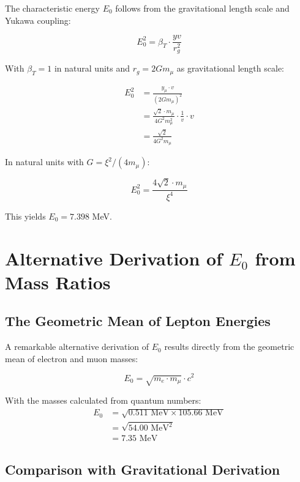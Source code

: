 	The characteristic energy $E_0$ follows from the gravitational length scale and Yukawa coupling:
	
	\begin{equation}
		E_0^2 = \beta_T \cdot \frac{yv}{r_g^2}
	\end{equation}
	
	With $\beta_T = 1$ in natural units and $r_g = 2Gm_\mu$ as gravitational length scale:
	
	\begin{align}
		E_0^2 &= \frac{y_\mu \cdot v}{(2Gm_\mu)^2}\\
		&= \frac{\sqrt{2} \cdot m_\mu}{4G^2 m_\mu^2} \cdot \frac{1}{v} \cdot v\\
		&= \frac{\sqrt{2}}{4G^2 m_\mu}
	\end{align}
	
	In natural units with $G = \xi^2/(4m_\mu)$:
	
	\begin{equation}
		E_0^2 = \frac{4\sqrt{2} \cdot m_\mu}{\xi^4}
	\end{equation}
	
	This yields $E_0 = 7.398$ MeV.
	
	\section{Alternative Derivation of $E_0$ from Mass Ratios}
	
	\subsection{The Geometric Mean of Lepton Energies}
	
	A remarkable alternative derivation of $E_0$ results directly from the geometric mean of electron and muon masses:
	
	\begin{equation}
		E_0 = \sqrt{m_e \cdot m_\mu} \cdot c^2
	\end{equation}
	
	With the masses calculated from quantum numbers:
	\begin{align}
		E_0 &= \sqrt{0.511 \text{ MeV} \times 105.66 \text{ MeV}}\\
		&= \sqrt{54.00 \text{ MeV}^2}\\
		&= 7.35 \text{ MeV}
	\end{align}
	
	\subsection{Comparison with Gravitational Derivation}
	
